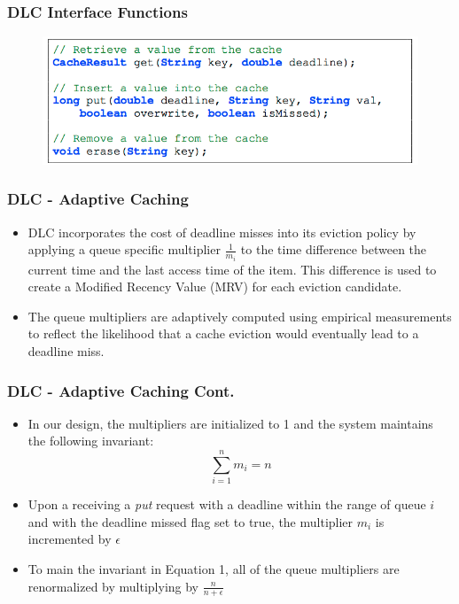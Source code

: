 \documentclass{beamer}
\begin{document}
\begin{frame}
  \frametitle{DLC Interface Functions}
  \begin{figure}
    \begin{center}
      \centerline{\includegraphics[scale=0.45]{img/DLC_interface.png}}
    \end{center}
  \end{figure}
\end{frame}

\begin{frame}
\frametitle{DLC - Adaptive Caching}
\begin{itemize}
\item DLC incorporates the cost of deadline misses
into its eviction policy by applying a queue specific
multiplier $\frac{1}{m_i}$ to the time difference between the current time
and the last access time of the item.
This difference is used to create a Modified Recency Value (MRV) for each eviction candidate.

\item The queue multipliers are adaptively computed using empirical measurements to reflect the likelihood
that a cache eviction would eventually lead to a deadline miss.
\end{itemize}


\end{frame}


\begin{frame}
\frametitle{DLC - Adaptive Caching Cont.}
\begin{itemize}
\item In our design, the multipliers are initialized to 1 and the system maintains the following invariant:
\begin{equation}
\label{eq:multiplier}
\sum\limits_{i=1}^n m_i = n
\end{equation}
\item Upon a receiving a \textit{put} request with a deadline within the range of queue $i$ and with
the deadline missed flag set to true, the multiplier $m_i$ is incremented by $\epsilon$
\item  To main the invariant in Equation 1, all of the queue multipliers are renormalized by
multiplying by $\frac{n}{n + \epsilon}$
\end{itemize}
\end{frame}
\end{document}
